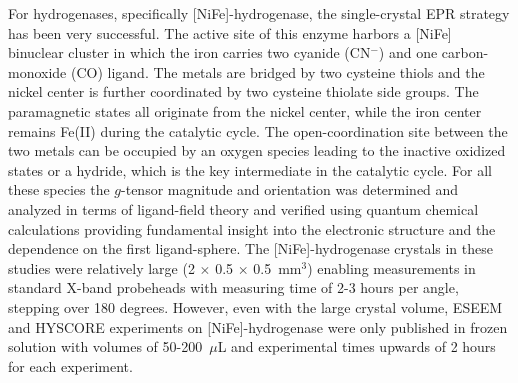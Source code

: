 For hydrogenases, specifically [NiFe]-hydrogenase, the single-crystal EPR strategy has been very successful. \cite{NiFe1996,NiFe2000,NiFe2003,NiFeRev2007} The active site of this enzyme harbors a [NiFe] binuclear cluster in which the iron carries two cyanide (CN$^-$) and one carbon-monoxide (CO) ligand. The metals are bridged by two cysteine thiols and the nickel center is further coordinated by two cysteine thiolate side groups. The paramagnetic states all originate from the nickel center, while the iron center remains Fe(II) during the catalytic cycle. \cite{lubitzhyd} The open-coordination site between the two metals can be occupied by an oxygen species leading to the inactive oxidized states or a hydride, which is the key intermediate in the catalytic cycle. \cite{NiFeRev2007} For all these species the $g$-tensor magnitude and orientation was determined and analyzed in terms of ligand-field theory and verified using quantum chemical calculations providing fundamental insight into the electronic structure and the dependence on the first ligand-sphere. \cite{Ping2005,Gasteljp0573902,NiFeRev2007,LubitzNiFe2016} The [NiFe]-hydrogenase crystals in these studies were relatively large (2 $\times$ 0.5 $\times$ 0.5~mm$^3$) enabling measurements in standard X-band probeheads with measuring time of 2-3 hours per angle, stepping over 180 degrees. However, even with the large crystal volume, ESEEM and HYSCORE experiments on [NiFe]-hydrogenase were only published in frozen solution with volumes of 50-200~$\mu$L and experimental times upwards of 2 hours for each experiment. \cite{NiFeRev2007} 

